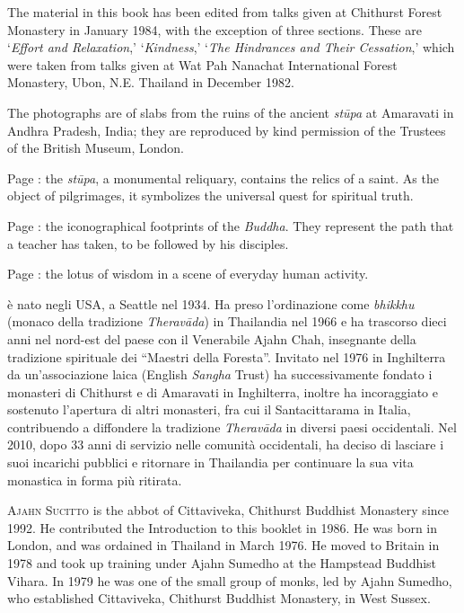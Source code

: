 
{\centering\par
\Large\scshape\chapTitleFont\thetitle
\par}
\vspace*{2\baselineskip}

{%
\setlength{\parskip}{1.5em}
\setlength{\parindent}{0pt}

The material in this book has been edited from talks given at Chithurst Forest Monastery in January 1984, with the exception of three sections. These are `\textit{Effort and Relaxation},' `\textit{Kindness},' `\textit{The Hindrances and Their Cessation},' which were taken from talks given at Wat Pah Nanachat International Forest Monastery, Ubon, N.E. Thailand in December 1982.

The photographs are of slabs from the ruins of the ancient \textit{stūpa} at Amaravati in Andhra Pradesh, India; they are reproduced by kind permission of the Trustees of the British Museum, London.

Page \pageref{image-stupa}: the \textit{stūpa}, a monumental reliquary, contains the relics of a saint. As the object of pilgrimages, it symbolizes the universal quest for spiritual truth.

Page \pageref{image-feet}: the iconographical footprints of the \textit{Buddha}. They represent the path that a teacher has taken, to be followed by his disciples.

Page \pageref{image-lotus-scene}: the lotus of wisdom in a scene of everyday human activity.

\clearpage
\thispagestyle{empty}

{\scshape \theauthor} è nato negli USA, a Seattle nel 1934. Ha
preso l'ordinazione come \textit{bhikkhu} (monaco della tradizione \textit{Theravāda}) in
Thailandia nel 1966 e ha trascorso dieci anni nel nord-est del paese con
il Venerabile Ajahn Chah, insegnante della tradizione spirituale dei
“Maestri della Foresta”. Invitato nel 1976 in Inghilterra da
un'associazione laica (English \textit{Sangha} Trust) ha successivamente fondato
i monasteri di Chithurst e di Amaravati in Inghilterra, inoltre ha
incoraggiato e sostenuto l'apertura di altri monasteri, fra cui il
Santacittarama in Italia, contribuendo a diffondere la tradizione
\textit{Theravāda} in diversi paesi occidentali. Nel 2010, dopo 33 anni di
servizio nelle comunità occidentali, ha deciso di lasciare i suoi
incarichi pubblici e ritornare in Thailandia per continuare la sua vita
monastica in forma più ritirata.

{\scshape Ajahn Sucitto} is the abbot of Cittaviveka, Chithurst Buddhist Monastery since 1992. He contributed the Introduction to this booklet in 1986. He was born in London, and was ordained in Thailand in March 1976. He moved to Britain in 1978 and took up training under Ajahn Sumedho at the Hampstead Buddhist Vihara. In 1979 he was one of the small group of monks, led by Ajahn Sumedho, who established Cittaviveka, Chithurst Buddhist Monastery, in West Sussex.


}

